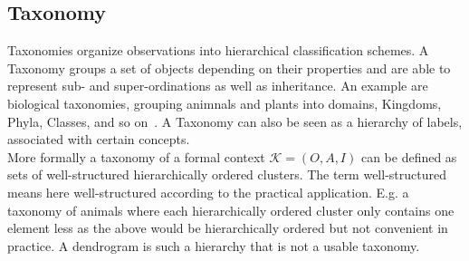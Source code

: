 \subsection{Taxonomy}\label{\positionnumber}
Taxonomies organize observations into hierarchical classification schemes. A Taxonomy groups a set of objects depending on their properties and are able to represent sub- and super-ordinations as well as inheritance. An example are biological taxonomies, grouping animnals and plants into domains, Kingdoms, Phyla, Classes, and so on~\cite{Krcmar2015, han2011data}. A Taxonomy can also be seen as a hierarchy of labels, associated with certain concepts. \\
More formally a taxonomy of a formal context $\mathcal{K} = (O, A, I)$ can be defined as sets of well-structured hierarchically ordered clusters. The term well-structured means here well-structured according to the practical application. E.g. a taxonomy of animals where each hierarchically ordered cluster only contains one element less as the above would be hierarchically ordered but not convenient in practice. A dendrogram is such a hierarchy that is not a usable taxonomy.


